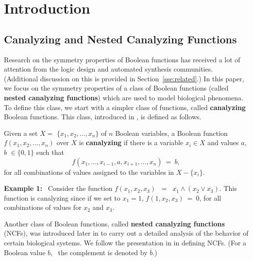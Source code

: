 \section{Introduction} 
\label{sec:intro}

\subsection{Canalyzing and Nested Canalyzing Functions}
\label{sse:ncf_def}

Research on the symmetry properties of Boolean
functions has received a lot of attention from the
logic design and automated synthesis communities. 
(Additional discussion on this is provided in Section~\ref{sse:related}.)
In this paper, we focus on the symmetry properties of
a class of Boolean functions (called \textbf{nested canalyzing functions})
which are used to model biological phenomena.
To define this class, we start with a simpler
class of functions, called \textbf{canalyzing} Boolean functions.
This class, introduced in \cite{Kauffman-1969}, is defined as follows.

\begin{definition}\label{def:canalyzing}
Given a set $X = $ $\{x_1, x_2, \ldots, x_n\}$ of $n$  Boolean variables,
a Boolean function $f(x_1, x_2, \ldots, x_n)$ over $X$ is \textbf{canalyzing}
if there is a variable $x_i \in X$ and values $a$, $b$ $\in \{0,1\}$ such that
\[
f(x_1, \ldots, x_{i-1}, a, x_{i+1}, \ldots, x_n) ~=~ b, 
\]
for all combinations of values assigned to the variables in $X - \{x_i\}$.
\end{definition}

\medskip

\noindent
\textbf{Example 1:}~ Consider the function 
$f(x_1, x_2, x_3)$ $~=~$ $\overline{x_1} \wedge (x_2 \vee \overline{x_3})$.
This function is canalyzing since if we set to $x_1 = 1$,
$f(1, x_2, x_3) ~=~ 0$, for all combinations of values for 
$x_2$ and $x_3$. %

\medskip

Another class of Boolean functions, called \textbf{nested canalyzing functions} (NCFs),
was introduced later in \cite{Kauffman-etal-2003} to carry out a detailed
analysis of the behavior of certain biological systems.
We follow the presentation in \cite{Layne-2011} in defining NCFs.
(For a Boolean value $b$,~ the complement is denoted by $\overline{b}$.)

